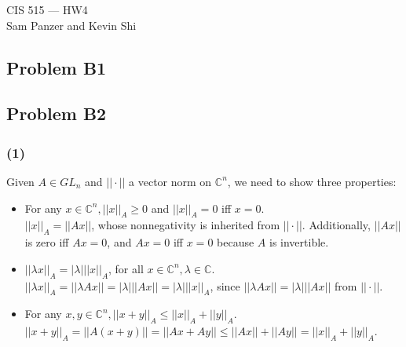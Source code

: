 \documentclass{article}
\newcommand{\complex}{\mathbb{C}}
\begin{document}
\begin{center}CIS 515 --- HW4\\Sam Panzer and Kevin Shi\end{center}
\subsection{Problem B1}
\subsection{Problem B2}
\subsubsection{(1)}
Given $A \in GL_n$ and $||\cdot||$ a vector norm on $\complex^n$, we need to show
three properties:
\begin{itemize}
  \item For any $x \in \complex^n, ||x||_A \geq 0$ and $||x||_A = 0$ iff $x = 0$.\\
    $||x||_A = ||Ax||$, whose nonnegativity is inherited from $||\cdot||$.
    Additionally, $||Ax||$ is zero iff $Ax = 0$, and $Ax = 0$ iff $x = 0$ because $A$ is invertible.
  \item $||\lambda x||_A = |\lambda|||x||_A$, for all $x \in \complex^n, \lambda \in \complex$.\\
    $||\lambda x||_A = ||\lambda A x|| = |\lambda|||A x|| = |\lambda| ||x||_A$, since 
    $||\lambda A x|| = |\lambda|||A x||$ from $||\cdot||$.
  \item For any $x,y \in \complex^n, ||x+y||_A \leq ||x||_A + ||y||_A$.\\
    $||x+y||_A = ||A(x+y)|| = ||Ax + Ay|| \leq ||Ax|| + ||Ay|| = ||x||_A + ||y||_A$.
\end{itemize}
\end{document}
